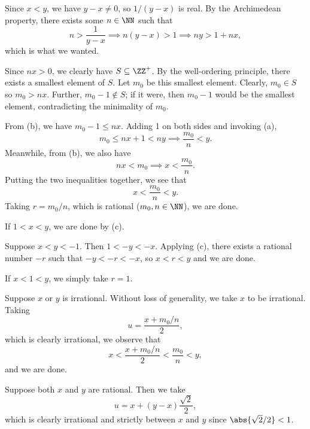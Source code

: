 \begin{solution}
    \begin{ppart}
        Since $x < y$, we have $y - x \neq 0$, so $1/(y-x)$ is real. By the Archimedean property, there exists some $n \in \NN$ such that \[n > \frac1{y-x} \implies n(y-x) > 1 \implies ny > 1 + nx,\] which is what we wanted.
    \end{ppart}
    \begin{ppart}
        Since $nx > 0$, we clearly have $S \subseteq \ZZ^+$. By the well-ordering principle, there exists a smallest element of $S$. Let $m_0$ be this smallest element. Clearly, $m_0 \in S$ so $m_0 > nx$. Further, $m_0 - 1 \notin S$; if it were, then $m_0 - 1$ would be the smallest element, contradicting the minimality of $m_0$.
    \end{ppart}
    \begin{ppart}
        From (b), we have $m_0 - 1 \leq nx$. Adding 1 on both sides and invoking (a), \[m_0 \leq nx + 1 < ny \implies \frac{m_0}{n} < y.\] Meanwhile, from (b), we also have \[nx < m_0 \implies x < \frac{m_0}{n}.\] Putting the two inequalities together, we see that \[x < \frac{m_0}{n} < y.\] Taking $r = m_0/n$, which is rational ($m_0, n \in \NN$), we are done.
    \end{ppart}
    \begin{ppart}
         If $1 < x < y$, we are done by (c).

         Suppose $x < y < -1$. Then $1 < -y < -x$. Applying (c), there exists a rational number $-r$ such that $-y < -r < -x$, so $x < r < y$ and we are done.

         If $x < 1 < y$, we simply take $r = 1$.
    \end{ppart}
    \begin{ppart}
         Suppose $x$ or $y$ is irrational. Without loss of generality, we take $x$ to be irrational. Taking \[u = \frac{x + m_0/n}{2},\] which is clearly irrational, we observe that \[x < \frac{x + m_0/n}{2} < \frac{m_0}{n} < y,\] and we are done.

         Suppose both $x$ and $y$ are rational. Then we take \[u = x + (y-x) \frac{\sqrt{2}}{2},\] which is clearly irrational and strictly between $x$ and $y$ since $\abs{\sqrt{2}/2} < 1$.
    \end{ppart}
\end{solution}

